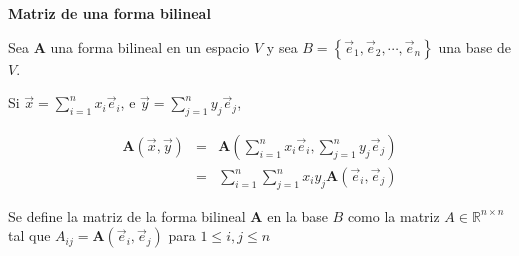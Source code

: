 \bigskip

\begin{definition}\textbf{Matriz de una forma bilineal} 

\bigskip

Sea  $\mathbf{A}$ una forma bilineal en un espacio $V$ y sea $B= \left\{\vec{e}_1,\vec{e}_2,\cdots, \vec{e}_n\right\}$ una base de $V$.


\bigskip

Si $\vec{x}=\sum^{n}_{i=1}x_i \vec{e}_i$, e $\vec{y}=\sum^{n}_{j=1}y_j \vec{e}_j$,


\begin{eqnarray*}
\mathbf{A}(\vec{x},\vec{y})&= &\mathbf{A} (\sum^{n}_{i=1} x_i \vec{e}_i, \sum^{n}_{j=1} y_j \vec{e}_j) \\
  &=&\sum^{n}_{i=1}\sum^{n}_{j=1} x_i y_j \mathbf{A}(\vec{e}_i, \vec{e}_j)
  \end{eqnarray*}


 Se define  la matriz de la forma bilineal $\mathbf{A}$ en la base $B$ como la matriz  $A \in \mathbb{R }^{n \times n }$    tal que $A_ {ij}= \mathbf{A}(\vec{e}_i,\vec{e}_j)$ para $1\leq i,j\leq n$
\end{definition}



\newpage






